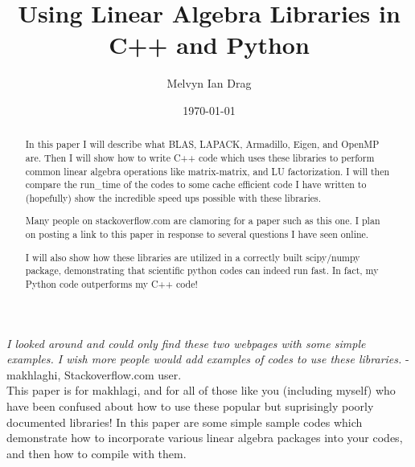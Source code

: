 \documentclass[11pt]{report}
\title{\textbf{Using Linear Algebra Libraries in C++ and Python}}
\author{Melvyn Ian Drag}
\date{\today}
\begin{document}
\maketitle
\begin{abstract}
In this paper I will describe what BLAS, LAPACK, Armadillo, Eigen, and OpenMP are. Then I will show how to write C++ code which uses these libraries to perform common linear algebra operations like matrix-matrix, and LU factorization. I will then compare the run\_time of the codes to some cache efficient code I have written to (hopefully) show the incredible speed ups possible with these libraries. 

Many people on stackoverflow.com are clamoring for a paper such as this one. I plan on posting a link to this paper in response to several questions I have seen online.

I will also show how these libraries are utilized in a correctly built scipy/numpy  package, demonstrating that scientific python codes can indeed run fast. In fact, my Python code outperforms my C++ code!
\end{abstract}
 \clearpage
 \emph{I looked around and could only find these two webpages with some simple examples. I wish more people would add examples of codes to use these libraries. }- makhlaghi, Stackoverflow.com user.\\

This paper is for makhlagi, and for all of those like you (including myself) who have been confused about how to use these popular but suprisingly poorly documented libraries! In this paper are some simple sample codes which demonstrate how to incorporate various linear algebra packages into your codes, and then how to compile with them.

\restoregeometry
 \tableofcontents{}





\end{document}
